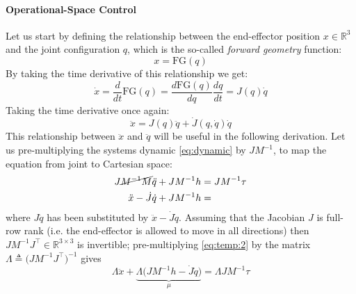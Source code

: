 	\paragraph{Operational-Space Control} Let us start by defining the relationship between the end-effector position $x \in \mathds{R}^3$ and the joint configuration $q$, which is the so-called \emph{forward geometry} function:
	\begin{equation}
	x = \text{FG}(q)
	\end{equation}
	By taking the time derivative of this relationship we get:
	\begin{equation}
	\dot x = \frac{d}{dt} \text{FG}(q) = \frac{d \text{FG}(q)}{dq} \frac{dq}{dt} = J(q) \dot q
	\end{equation}
	Taking the time derivative once again:
	\begin{equation}
	\ddot x = J(q) \ddot q + \dot{J}(q, \dot q) \dot q
	\end{equation}
	This relationship between $\ddot x$ and $\ddot q$ will be useful in the following derivation.
	Let us pre-multiplying the systems dynamic \eqref{eq:dynamic} by $JM^{-1}$, to map the equation from joint to Cartesian space:
	\begin{equation} \label{eq:temp:2}
	\begin{split}
		J\cancel{M^{-1}M}\ddot q + JM^{-1} h & = JM^{-1} \tau \\
		\ddot x - \dot J \dot q + JM^{-1}h & =
	\end{split}
	\end{equation}
	where $J \ddot q$ has been substituted by $\ddot x - \dot J \dot q$. 
	Assuming that the Jacobian $J$ is full-row rank (i.e. the end-effector is allowed to move in all directions) then $JM^{-1}J^\top \in \mathds R^{3 \times 3}$ is invertible; pre-multiplying \eqref{eq:temp:2} by the matrix $\Lambda \triangleq \big(JM^{-1}J^\top\big)^{-1}$ gives
	\begin{equation*}
		\Lambda \ddot x + \underbrace{\Lambda\big(JM^{-1}h - \dot J \dot q\big)}_{\mu} = \Lambda J M^{-1}\tau
	\end{equation*}
	
